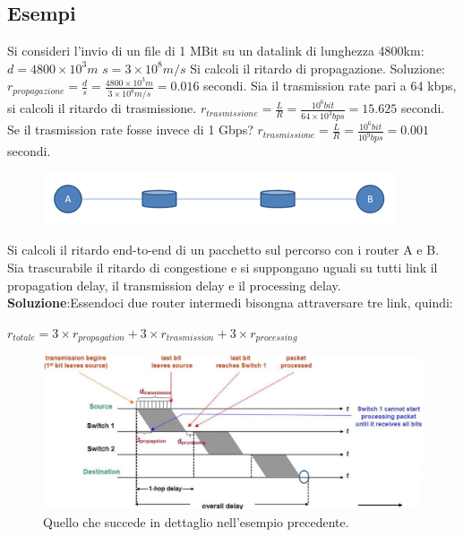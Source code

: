 \documentclass[11pt,a4paper,oneside]{book}
\theoremstyle{definition}
\begin{document}
\subsection{Esempi}
Si consideri l'invio di un file di 1 MBit su un datalink di lunghezza 4800km:\newline
$d = 4800\times10^3 m$ \newline
$s = 3\times10^8 m/s$ \newline
Si calcoli il ritardo di propagazione. \newline
Soluzione:\newline\newline
$r_{propagazione} = \frac{d}{s} = \frac{4800\times10^3 m }{3\times10^8 m/s}  = 0.016$ secondi.\newline\newline
Sia il trasmission rate pari a 64 kbps, si calcoli il ritardo di trasmissione. \newline\newline
$r_{trasmissione} = \frac{L}{R} = \frac{10^6 bit}{64\times10^3 bps}= 15.625$ secondi.\newline\newline
Se il trasmission rate fosse invece di 1 Gbps? \newline\newline
$r_{trasmissione} = \frac{L}{R} = \frac{10^6 bit}{10^9 bps} = 0.001$ secondi.

\begin{figure}[!h]
	\includegraphics[scale=0.5]{Immagini/Esempio_ritardi.png}
	\centering
\end{figure}
Si calcoli il ritardo end-to-end di un pacchetto sul percorso con i router A e B. Sia trascurabile il ritardo di congestione e si suppongano uguali su tutti link il propagation delay, il transmission delay e il processing delay.\newline\newline
\textbf{Soluzione}:\newline Essendoci due router intermedi bisongna attraversare tre link, quindi:

{\centering $r_{totale} = 3\times r_{propagation} + 3\times r_{trasmission} + 3\times r_{processing}$ \par}

\begin{figure}[!h]
	\includegraphics[scale=0.35]{Immagini/Soluzione_ritardi.png}
	\centering
	\caption{Quello che succede in dettaglio nell'esempio precedente.}
\end{figure}
\end{document}
